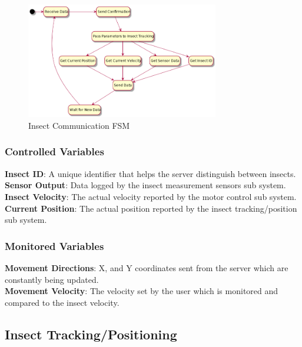 \documentclass[11pt]{article}
\begin{document}
\begin{figure}[H]
   \centering
   \includegraphics[width=0.75\textwidth]{diagram/insectCom.png}
   \caption{Insect Communication FSM}
   \label{fig:fsm}
\end{figure}

\subsubsection{Controlled Variables}
\textbf{Insect ID}: A unique identifier that helps the server distinguish between insects. \\  
\textbf{Sensor Output}: Data logged by the insect measurement sensors sub system. \\
\textbf{Insect Velocity}: The actual velocity reported by the motor control sub system. \\ 
\textbf{Current Position}: The actual position reported by the insect tracking/position sub system. \\


\subsubsection{Monitored Variables}
\textbf{Movement Directions}: X, and Y coordinates sent from the server which are constantly being updated. \\
\textbf{Movement Velocity}: The velocity set by the user which is monitored and compared to the insect velocity. \\



\subsection{Insect Tracking/Positioning}
\end{document}
